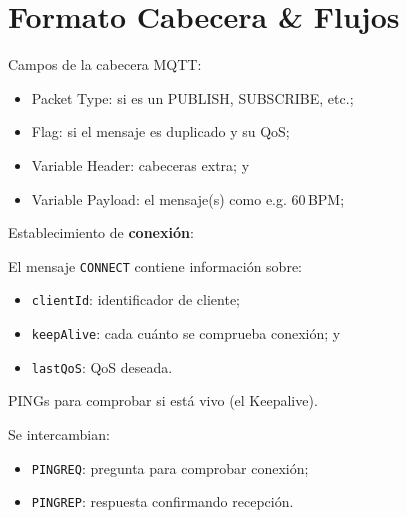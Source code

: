 \documentclass[xcolor={x11names}]{beamer}
\begin{document}
\section{Formato Cabecera \& Flujos}
\begin{frame}{\secname}
    Campos de la cabecera MQTT:
    \begin{itemize}
        \item Packet Type: si es un PUBLISH, SUBSCRIBE, etc.;
        \item Flag: si el mensaje es duplicado y su QoS;
        \item Variable Header: cabeceras extra; y
        \item Variable Payload: el mensaje(s) como e.g. 
            60\,\textrm{BPM};
    \end{itemize}
    \begin{figure}
        
    \end{figure}
\end{frame}


\begin{frame}{\secname}
    Establecimiento de \textbf{conexión}:
    \begin{figure}
        
    \end{figure}
    El mensaje \texttt{CONNECT} contiene
    información sobre:
    \begin{itemize}
        \item \texttt{clientId}: identificador de cliente;
        \item \texttt{keepAlive}: cada cuánto se comprueba
            conexión; y
        \item \texttt{lastQoS}: QoS deseada.
    \end{itemize}
\end{frame}





\begin{frame}{\secname}
    PINGs para comprobar si está vivo (el Keepalive).
    \begin{figure}
        
    \end{figure}
    Se intercambian:
    \begin{itemize}
        \item \texttt{PINGREQ}: pregunta para comprobar conexión;
        \item \texttt{PINGREP}: respuesta confirmando recepción.
    \end{itemize}
\end{frame}
\end{document}
